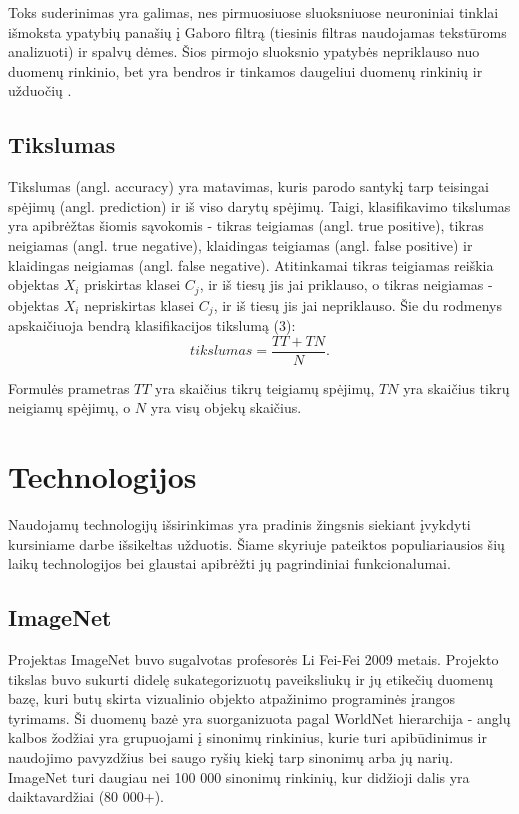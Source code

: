 \documentclass{VUMIFPSkursinis}
\begin{document}
Toks suderinimas yra galimas, nes pirmuosiuose sluoksniuose neuroniniai tinklai išmoksta ypatybių panašių į Gaboro filtrą 
(tiesinis filtras naudojamas tekstūroms analizuoti) ir spalvų dėmes. Šios pirmojo sluoksnio ypatybės nepriklauso nuo duomenų rinkinio, bet yra bendros ir tinkamos 
daugeliui duomenų rinkinių ir užduočių \cite{DBLP:journals/corr/YosinskiCBL14}.

\subsection{Tikslumas}
Tikslumas (angl. accuracy) yra matavimas, kuris parodo santykį tarp teisingai spėjimų (angl. prediction) ir iš viso darytų spėjimų.
Taigi, klasifikavimo tikslumas yra apibrėžtas šiomis sąvokomis - tikras teigiamas (angl. true positive), tikras neigiamas (angl. true negative), klaidingas teigiamas (angl. false positive) ir klaidingas neigiamas (angl. false negative). Atitinkamai tikras teigiamas reiškia objektas \(X_{i}\) priskirtas klasei \(C_{j}\), ir iš tiesų jis jai priklauso, o tikras neigiamas - objektas \(X_{i}\) nepriskirtas klasei \(C_{j}\), ir iš tiesų jis jai nepriklauso. Šie du rodmenys apskaičiuoja bendrą klasifikacijos tikslumą (3):
\begin{equation}
tikslumas = \frac{TT + TN}{N}.
\end{equation}

Formulės prametras \(TT\) yra skaičius tikrų teigiamų spėjimų, \(TN\) yra skaičius tikrų neigiamų spėjimų, o \(N\) yra visų objekų skaičius.

\section{Technologijos}
Naudojamų technologijų išsirinkimas yra pradinis žingsnis siekiant įvykdyti kursiniame darbe išsikeltas užduotis. Šiame skyriuje pateiktos populiariausios šių laikų technologijos 
bei glaustai apibrėžti jų pagrindiniai funkcionalumai.

\subsection{ImageNet}
Projektas ImageNet buvo sugalvotas profesorės Li Fei-Fei 2009 metais. Projekto tikslas buvo sukurti didelę sukategorizuotų paveiksliukų ir jų etikečių duomenų bazę, 
kuri butų skirta vizualinio objekto atpažinimo programinės įrangos tyrimams. Ši duomenų bazė yra suorganizuota pagal WorldNet hierarchija - anglų kalbos žodžiai 
yra grupuojami į sinonimų rinkinius, kurie turi apibūdinimus ir naudojimo pavyzdžius bei saugo ryšių kiekį tarp sinonimų arba jų narių. ImageNet turi daugiau nei 
100 000 sinonimų rinkinių, kur didžioji dalis yra daiktavardžiai (80 000+). 
\end{document}
